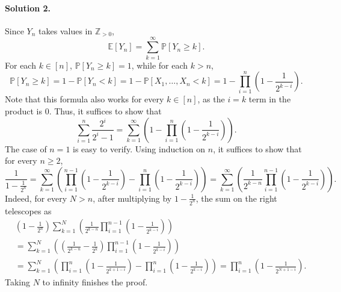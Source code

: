 \documentclass{article}
\begin{document}
\paragraph{Solution 2.}
Since $Y_n$ takes values in $\mathbb{Z}_{>0}$,
\[
\mathbb{E}[Y_n] = \sum_{k=1}^{\infty} \mathbb{P}[Y_n \geq k].
\]
For each $k \in [n]$, $\mathbb{P}[Y_n \geq k] = 1$, while for each $k > n$,
\[
\mathbb{P}[Y_n \geq k] = 1 - \mathbb{P}[Y_n < k] = 1 - \mathbb{P}[X_1, \ldots, X_n < k] = 1 - \prod_{i=1}^n \left(1 - \frac{1}{2^{k-i}}\right).
\]
Note that this formula also works for every $k \in [n]$, as the $i = k$ term in the product is $0$. Thus, it suffices to show that
\[
\sum_{i=1}^n \frac{2^i}{2^i - 1} = \sum_{k=1}^{\infty}\left(1 - \prod_{i=1}^n \left(1 - \frac{1}{2^{k-i}}\right)\right).
\]
The case of $n = 1$ is easy to verify. Using induction on $n$, it suffices to show that for every $n \geq 2$,
\[
\frac{1}{1 - \frac{1}{2^n}} = \sum_{k=1}^{\infty}\left(\prod_{i=1}^{n-1}\left(1 - \frac{1}{2^{k-i}}\right) - \prod_{i=1}^n\left(1 - \frac{1}{2^{k-i}}\right)\right) = \sum_{k=1}^{\infty}\left(\frac{1}{2^{k-n}} \prod_{i=1}^{n-1}\left(1 - \frac{1}{2^{k-i}}\right)\right).
\]
Indeed, for every $N > n$, after multiplying by $1 - \frac{1}{2^n}$, the sum on the right telescopes as
\begin{align*}
&\left(1 - \frac{1}{2^n}\right) \sum_{k=1}^N\left(\frac{1}{2^{k-n}} \prod_{i=1}^{n-1}\left(1 - \frac{1}{2^{k-i}}\right)\right) \\
&= \sum_{k=1}^N\left(\left(\frac{1}{2^{k-n}} - \frac{1}{2^k}\right)\prod_{i=1}^{n-1}\left(1 - \frac{1}{2^{k-i}}\right)\right) \\
&= \sum_{k=1}^N\left(\prod_{i=1}^n\left(1 - \frac{1}{2^{k+1-i}}\right) - \prod_{i=1}^n\left(1 - \frac{1}{2^{k-i}}\right)\right) = \prod_{i=1}^n\left(1 - \frac{1}{2^{N+1-i}}\right).
\end{align*}
Taking $N$ to infinity finishes the proof.
\end{document}
